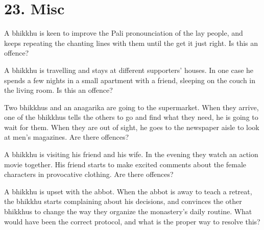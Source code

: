 \chapter{23. Misc}
\renewcommand*{\theChapterTitle}{23. Misc}

A bhikkhu is keen to improve the Pali pronounciation of the lay people, and
keeps repeating the chanting lines with them until the get it just right.
Is this an offence?

\bigskip

A bhikkhu is travelling and stays at different supporters' houses. In one case
he spends a few nights in a small apartment with a friend, sleeping on the couch
in the living room. Is this an offence?

\bigskip

Two bhikkhus and an anagarika are going to the supermarket. When they arrive,
one of the bhikkhus tells the others to go and find what they need, he is going
to wait for them. When they are out of sight, he goes to the newspaper aisle to
look at men's magazines. Are there offences?

\bigskip

A bhikkhu is visiting his friend and his wife. In the evening they watch an
action movie together. His friend starts to make excited comments about the
female characters in provocative clothing. Are there offences?

\bigskip

A bhikkhu is upset with the abbot. When the abbot is away to teach a retreat,
the bhikkhu starts complaining about his decisions, and convinces the other
bhikkhus to change the way they organize the monastery's daily routine.
What would have been the correct protocol, and what is the proper way to resolve this?

